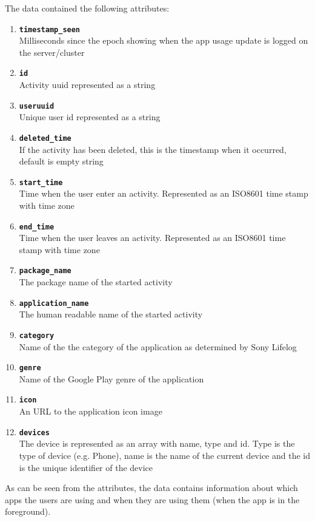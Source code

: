 The data contained the following attributes:
\begin{enumerate}
\item \texttt{\textbf{timestamp\_seen}}\\Milliseconds since the epoch showing when the app usage update is logged on the server/cluster 
\item \texttt{\textbf{id}}\\Activity uuid represented as a string  
\item \texttt{\textbf{useruuid}}\\Unique user id represented as a string 
\item \texttt{\textbf{deleted\_time}}\\ If the activity has been deleted, this is the timestamp when it occurred, default is empty string
\item \texttt{\textbf{start\_time}}\\Time when the user enter an activity. Represented as an ISO8601 time stamp with time zone 
\item \texttt{\textbf{end\_time}}\\Time when the user leaves an activity. Represented as an ISO8601 time stamp with time zone
\item \texttt{\textbf{package\_name}}\\ The package name of the started activity
\item \texttt{\textbf{application\_name}}\\The human readable name of the started activity
\item \texttt{\textbf{category}}\\Name of the the category of the application as determined by Sony Lifelog
\item \texttt{\textbf{genre}}\\Name of the Google Play genre of the application
\item \texttt{\textbf{icon}}\\ An URL to the application icon image
\item \texttt{\textbf{devices}}\\The device is represented as an array with name, type and id. Type is the type of device (e.g. Phone), name is the name of the current device and the id is the unique identifier of the device 
\end{enumerate}
As can be seen from the attributes, the data contains information about which apps the users are using and when they are using them (when the app is in the foreground).

